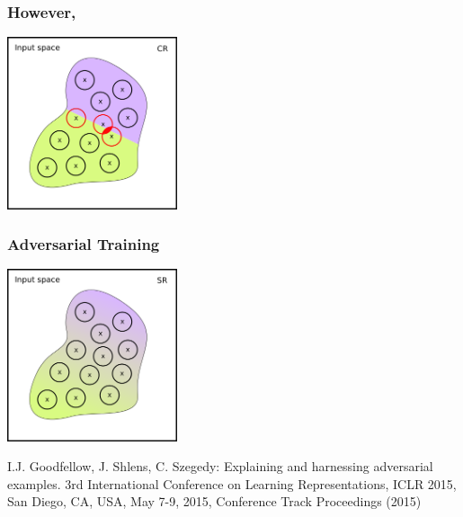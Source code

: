 \documentclass[aspectratio=169]{beamer}
\begin{document}
\begin{frame}[fragile]
  \frametitle{However,}



\begin{center}

  \includegraphics[width=5cm]{Images/SR-vs-CR-5.png}

  \end{center}
  
 \end{frame}

 \begin{frame}[fragile]
  \frametitle{Adversarial Training}



\begin{center}

  \includegraphics[width=5cm]{Images/SR-vs-CR-3.png}

  \end{center}
   {\scriptsize
   \begin{thebibliography}{99}
        \beamertemplatearticlebibitems
I.J. Goodfellow, J. Shlens, C. Szegedy: Explaining and harnessing adversarial examples. 3rd International Conference on Learning Representations,
ICLR 2015, San Diego, CA, USA, May 7-9, 2015, Conference Track Proceedings (2015)
 \end{thebibliography}}
 \end{frame}
\end{document}
